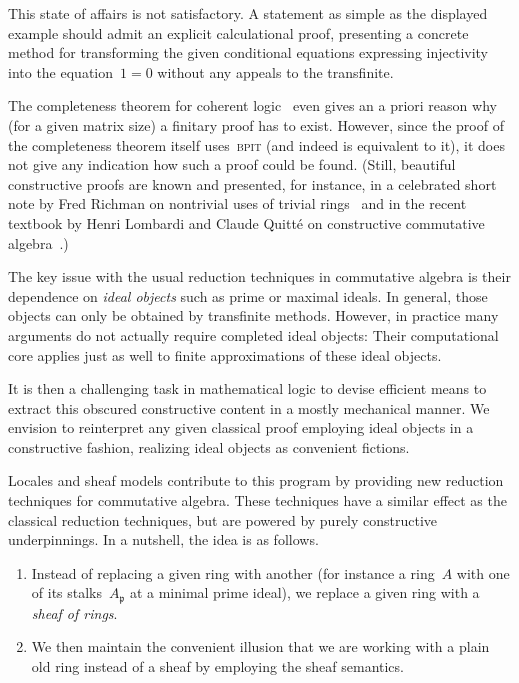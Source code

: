 \documentclass{ws-rv9x6}
\newcommand{\ppp}{\mathfrak{p}}
\renewcommand{\_}{\mathpunct{.}}
\newcommand{\?}{\,{:}\,}
\newcommand{\BPIT}{\textsc{bpit}\xspace}
\begin{document}
This state of affairs is not satisfactory. A statement as simple as the
displayed example should admit an explicit calculational proof, presenting a
concrete method for transforming the given conditional equations expressing
injectivity into the equation~$1 = 0$ without any appeals to the transfinite.

The completeness theorem for coherent logic~\cite[Corollary~D1.5.10]{johnstone:elephant} even
gives an a priori reason why (for a given matrix size) a finitary proof has to
exist. However, since the proof of the completeness theorem itself uses~\BPIT
(and indeed is equivalent to it), it does not give any indication how such a
proof could be found. (Still, beautiful constructive proofs are known and
presented, for instance, in a celebrated short note by Fred Richman on nontrivial
uses of trivial rings~\cite{richman:trivial-rings} and in the recent textbook by
Henri Lombardi and Claude Quitté on constructive commutative
algebra~\cite{lombardi-quitte:constructive-algebra}.)

The key issue with the usual reduction techniques in commutative algebra is
their dependence on \emph{ideal objects} such as prime or maximal ideals. In
general, those objects can only be obtained by transfinite methods. However, in
practice many arguments do not actually require completed ideal objects:
Their computational core applies just as well to finite approximations of
these ideal objects.

It is then a challenging task in mathematical logic to devise efficient means to
extract this obscured constructive content in a mostly mechanical manner. We
envision to reinterpret any given classical proof employing ideal objects in a
constructive fashion, realizing ideal objects as convenient fictions.

Locales and sheaf models contribute to this program by providing new reduction
techniques for commutative algebra. These techniques have a similar effect as the
classical reduction techniques, but are powered by purely constructive
underpinnings. In a nutshell, the idea is as follows.

\begin{enumerate}
\item Instead of replacing a given ring with another (for instance a ring~$A$ with
one of its stalks~$A_\ppp$ at a minimal prime ideal), we replace a given ring
with a \emph{sheaf of rings}.
\item We then maintain the convenient illusion that we are working with a plain old ring
instead of a sheaf by employing the sheaf semantics.
\end{enumerate}
\end{document}
